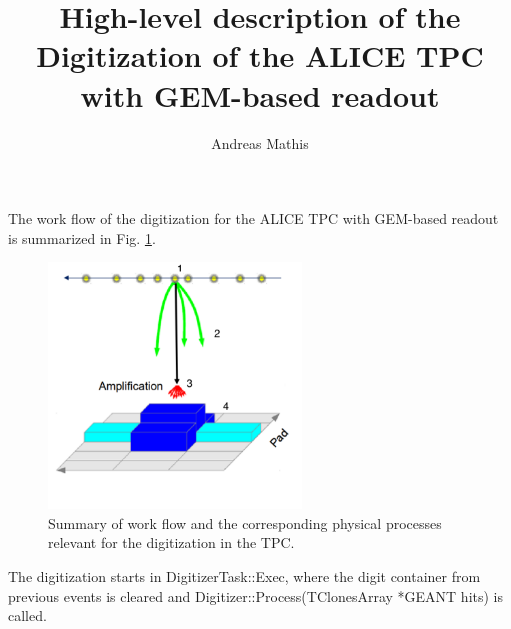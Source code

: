 \documentclass[12pt,DIV=14,parskip=half]{scrartcl}
\title{High-level description of the Digitization of the ALICE TPC with GEM-based readout}
\author{Andreas Mathis} %
\begin{document}
 
\maketitle

The work flow of the digitization for the ALICE TPC with GEM-based readout is summarized in Fig. \ref{fig:workflow}.

\begin{figure}
\centering
\includegraphics[width=0.6\textwidth]{figures/workflow}
\caption{Summary of work flow and the corresponding physical processes relevant for the digitization in the TPC.}
\label{fig:workflow}
\end{figure}

The digitization starts in DigitizerTask::Exec, where the digit container from previous events is cleared and Digitizer::Process(TClonesArray *GEANT hits) is called.
\end{document}
